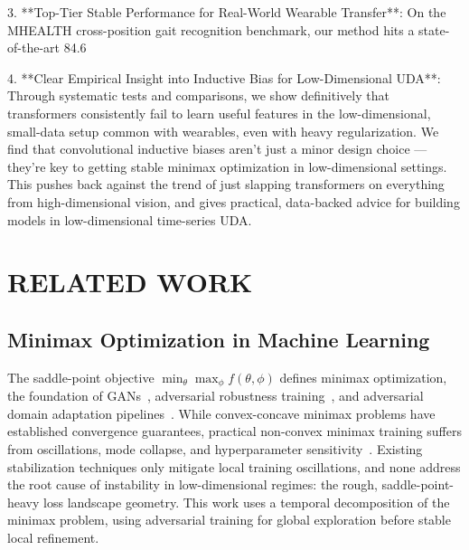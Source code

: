 \documentclass[conference]{IEEEtran}
\begin{document}
3.  **Top-Tier Stable Performance for Real-World Wearable Transfer**: On the MHEALTH cross-position gait recognition benchmark, our method hits a state-of-the-art 84.6%

4.  **Clear Empirical Insight into Inductive Bias for Low-Dimensional UDA**: Through systematic tests and comparisons, we show definitively that transformers consistently fail to learn useful features in the low-dimensional, small-data setup common with wearables, even with heavy regularization. We find that convolutional inductive biases aren’t just a minor design choice — they’re key to getting stable minimax optimization in low-dimensional settings. This pushes back against the trend of just slapping transformers on everything from high-dimensional vision, and gives practical, data-backed advice for building models in low-dimensional time-series UDA.

\section{RELATED WORK}
\label{sec:related}

\subsection{Minimax Optimization in Machine Learning}
The saddle-point objective $\min_\theta \max_\phi f(\theta, \phi)$ defines minimax optimization, the foundation of GANs~\cite{goodfellow2014generative}, adversarial robustness training~\cite{madry2018towards}, and adversarial domain adaptation pipelines~\cite{ganin2016domain}. While convex-concave minimax problems have established convergence guarantees, practical non-convex minimax training suffers from oscillations, mode collapse, and hyperparameter sensitivity~\cite{daskalakis2018training,mescheder2018training}. Existing stabilization techniques only mitigate local training oscillations, and none address the root cause of instability in low-dimensional regimes: the rough, saddle-point-heavy loss landscape geometry. This work uses a temporal decomposition of the minimax problem, using adversarial training for global exploration before stable local refinement.
\end{document}
